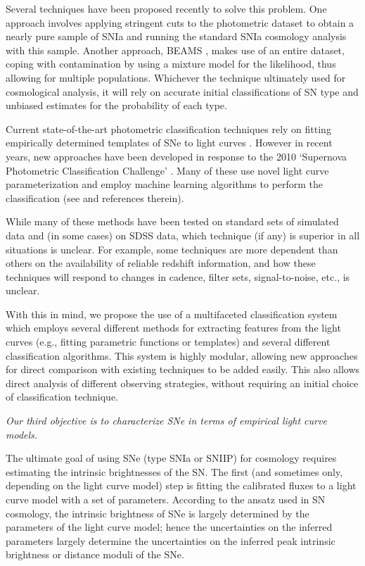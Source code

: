 Several techniques have been proposed recently to solve this problem. One 
approach involves applying stringent cuts to the photometric dataset to obtain a nearly pure sample 
of SNIa \citep{Bernstein2012,Campbell2013} and running the standard SNIa cosmology analysis 
with this sample. Another approach, BEAMS \citep{Kunz2007,Newling2011,Hlozek2012,Knights2013}, 
makes use of an entire dataset, coping with contamination by using a mixture model for the 
likelihood, thus allowing for multiple populations. Whichever the technique ultimately used for 
cosmological analysis, it will rely on accurate initial classifications of SN type and 
unbiased estimates for the probability of each type.

Current state-of-the-art photometric classification techniques rely on
fitting empirically determined templates of SNe to light curves
\citep{Jha2007,Guy2007,Sako2011}. However in recent years, new approaches
have been developed in response to the 2010 `Supernova Photometric
Classification Challenge' \citep{Kessler2010a}. Many of these use novel
light curve parameterization and employ machine learning algorithms to
perform the classification (see \citet{Kessler2010b} and references
therein).

While many of these methods have been tested on standard sets of simulated data and (in some cases) 
on SDSS data, which technique (if any) is superior in all situations is unclear. For 
example, some techniques are more dependent than others on the availability of reliable redshift information, and how 
these techniques will respond to changes in cadence, filter sets, signal-to-noise, 
etc., is unclear.  

With this in mind, we propose the use of a multifaceted classification system which
employs several different methods for extracting features from the light curves (e.g.,
fitting parametric functions or templates) and several different classification
algorithms. This system is highly modular, allowing new approaches for direct comparison
with existing  techniques to be added easily. This also allows direct analysis of
different observing strategies, without requiring an initial choice of classification
technique.


{\emph{Our third objective is to characterize SNe in terms of empirical
    light curve models.}}

The ultimate goal of using SNe (type SNIa or SNIIP) for cosmology requires estimating the
intrinsic brightnesses of the SN. The first (and sometimes only, depending on the light
curve model) step is fitting the calibrated fluxes to a light curve model with a set of
parameters. According to the ansatz used in SN cosmology, the intrinsic brightness of SNe
is largely determined by the parameters of the light curve model; hence the uncertainties
on the inferred parameters largely determine the uncertainties on the inferred peak
intrinsic brightness or distance moduli of the SNe.

